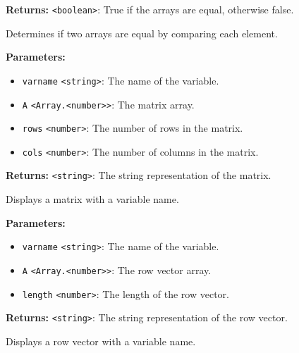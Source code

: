 \documentclass[12pt,a4paper]{article}
\begin{document}
\noindent \textbf{Returns:} \texttt{<boolean>}: True if the arrays are equal, otherwise false.

\noindent Determines if two arrays are equal by comparing each element.

\vspace{5mm}
\noindent {}


\noindent \textbf{Parameters:}
\begin{itemize}
  \item \texttt{varname} \texttt{<string>}: The name of the variable.
  \item \texttt{A} \texttt{<Array.<number>>}: The matrix array.
  \item \texttt{rows} \texttt{<number>}: The number of rows in the matrix.
  \item \texttt{cols} \texttt{<number>}: The number of columns in the matrix.
\end{itemize}

\noindent \textbf{Returns:} \texttt{<string>}: The string representation of the matrix.

\noindent Displays a matrix with a variable name.

\vspace{5mm}
\noindent {}


\noindent \textbf{Parameters:}
\begin{itemize}
  \item \texttt{varname} \texttt{<string>}: The name of the variable.
  \item \texttt{A} \texttt{<Array.<number>>}: The row vector array.
  \item \texttt{length} \texttt{<number>}: The length of the row vector.
\end{itemize}

\noindent \textbf{Returns:} \texttt{<string>}: The string representation of the row vector.

\noindent Displays a row vector with a variable name.

\vspace{5mm}
\noindent {}
\end{document}
